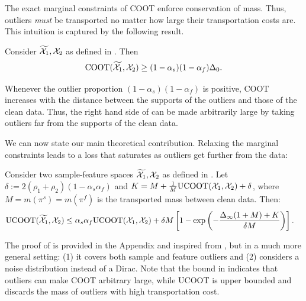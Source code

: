 The exact marginal constraints of COOT enforce conservation of mass.
Thus, outliers \emph{must} be transported no matter how large their transportation costs are.
This intuition is captured by the following result.
\begin{proposition}
Consider $\widetilde{\mathcal X_1}, \mathcal X_2$ as defined in .
Then
\label{prop:coot_not_robust}
\begin{equation}
    \text{COOT}(\widetilde{\mathcal X_1}, \mathcal X_2) \geq (1 - \alpha_s)(1-\alpha_f)\Delta_0.
\end{equation}
\end{proposition}
Whenever the outlier proportion $(1-\alpha_s)(1-\alpha_f)$ is positive,
COOT increases with the distance between the supports of the outliers and those of the clean data.
Thus, the right hand side of  can be made arbitrarily
large by taking outliers far from the supports of the clean data.

We can now state our main theoretical contribution.
Relaxing the marginal constraints leads to a loss that saturates
as outliers get further from the data:
\begin{theorem}
\label{thm:ucoot_robust}
Consider two sample-feature spaces $\widetilde{\mathcal X_1}, \mathcal X_2$ as defined
in . Let $\delta := 2(\rho_1 + \rho_2)(1 - \alpha_s\alpha_f)$
and $K = M + \frac{1}{M}\text{UCOOT}(\mathcal X_1, \mathcal X_2) +\delta$,
where $M= m(\pi^s) = m(\pi^f)$ is the transported mass between clean data. Then:
\begin{align} %
  \ucoot(\widetilde{\cX_1}, \cX_2)
  &\leq \alpha_s \alpha_f \ucoot(\cX_1, \cX_2)
  + \delta M \left[ 1 - \exp \left( {- \frac{\Delta_{\infty}(1+M) + K}{\delta M}} \right) \right].
\end{align}
\end{theorem}
The proof of  is provided in the Appendix and
inspired from \citep{Fatras21}, but in a much more general setting:
(1) it covers both sample and feature outliers and
(2) considers a noise distribution instead of a Dirac.
Note that the bound in 
indicates that outliers can make COOT arbitrary large,
while UCOOT is upper bounded and discards the mass of outliers with high transportation cost.

